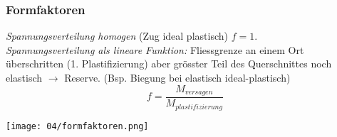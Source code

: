         \subsubsection{Formfaktoren}
            \textit{Spannungsverteilung homogen} (Zug ideal plastisch) $f=1$.
            \\\textit{Spannungsverteilung als lineare Funktion:} Fliessgrenze an einem Ort überschritten (1. Plastifizierung) aber grösster Teil des Querschnittes noch elastisch $\rightarrow$ Reserve. (Bsp. Biegung bei elastisch ideal-plastisch)
            \[f=\frac{M_{versagen}}{M_{plastifizierung}}\]
            \begin{center}
                \texttt{[image: 04/formfaktoren.png]}
            \end{center}
    
            